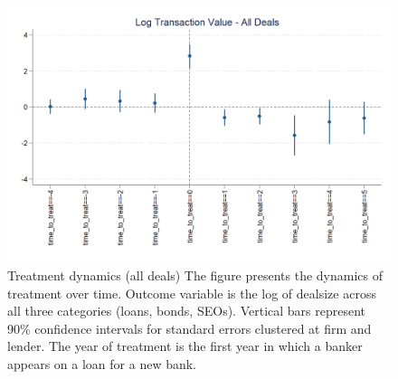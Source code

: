 

\begin{figure}[H]
	\caption{Treatment dynamics (all deals) \newline
		The figure presents the dynamics of treatment over time. Outcome variable is the log of dealsize across all three categories (loans, bonds, SEOs). Vertical bars represent 90\% confidence intervals for standard errors clustered at firm and lender. The year of treatment is the first year in which a banker appears on a loan for a new bank.} 
	\label{fig:dynamics_full}
	\centering
	\includegraphics[angle=0,  scale=0.35]{figures/dynamics_logdealsize.png}
\end{figure}

\clearpage \newpage


